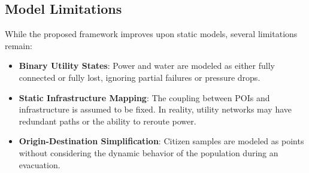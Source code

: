 \subsection{Model Limitations}
\label{subsec:model-limitations}

While the proposed framework improves upon static models, several limitations remain:
\begin{itemize}
    \item \textbf{Binary Utility States}: Power and water are modeled as either fully connected or fully lost, ignoring partial failures or pressure drops.
    \item \textbf{Static Infrastructure Mapping}: The coupling between POIs and infrastructure is assumed to be fixed. In reality, utility networks may have redundant paths or the ability to reroute power.
    \item \textbf{Origin-Destination Simplification}: Citizen samples are modeled as points without considering the dynamic behavior of the population during an evacuation.
\end{itemize}
